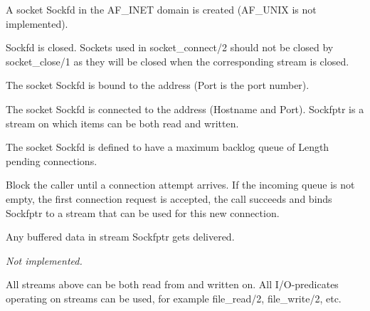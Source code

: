 \begin{description}
    A socket Sockfd in the AF\_INET domain is created (AF\_UNIX is not
implemented). 

    Sockfd is closed. Sockets used in socket\_connect/2 should not be
closed by socket\_close/1 as they will be closed when the corresponding
stream is closed.

   The socket Sockfd is bound to the address (Port is the port number).

    The socket Sockfd is connected to the address (Hostname and
Port). Sockfptr is a stream on which items can be both read and written.

    The socket Sockfd is defined to have a maximum backlog queue of
Length pending connections.

    Block the caller until a connection attempt arrives. If the incoming 
    queue is not empty, the first connection request is accepted, the call
    succeeds and binds Sockfptr to a stream that can be used for this new
    connection.

    Any buffered data in stream Sockfptr gets delivered.

  \emph{Not implemented.}

\end{description}

All streams above can be both read from and written on. All
I/O-predicates operating on streams can be used, for example
file\_read/2, file\_write/2, etc.


